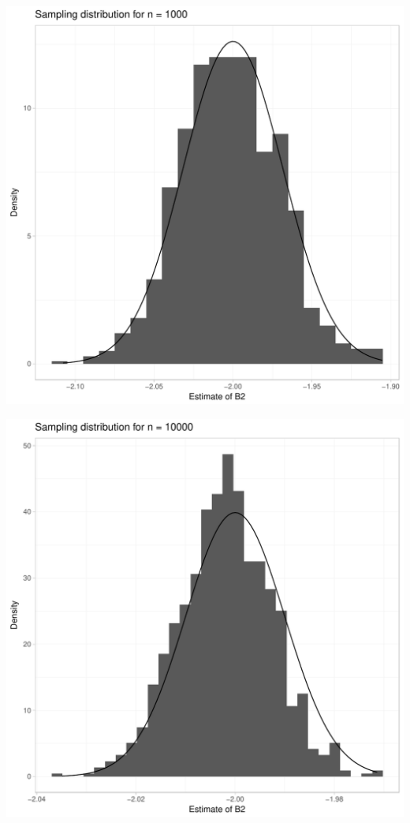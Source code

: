 \documentclass[english, 11pt]{article}\usepackage[]{graphicx}\usepackage[]{color}
\makeatletter
\def\maxwidth{ %
  \ifdim\Gin@nat@width>\linewidth
    \linewidth
  \else
    \Gin@nat@width
  \fi
}
\newenvironment{knitrout}{}{} %
\makeatother
\begin{document}
\begin{knitrout}
\includegraphics[width=\maxwidth]{figure/Q2_looping-3} 

\includegraphics[width=\maxwidth]{figure/Q2_looping-4} 


\end{knitrout}
\end{document}
